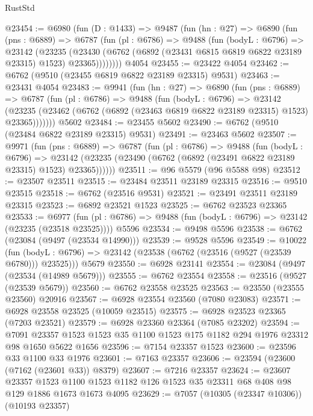 \begin{lexlean}{RustStd}
\begin{coremodule}
@23454 := @6980
    (fun (D : @1433) =>
    @9487
      (fun (hn : @27) =>
      @6890
        (fun (pns : @6889) =>
        @6787
          (fun (pl : @6786) =>
          @9488
            (fun (bodyL : @6796) =>
            @23142
              (@23235
                (@23430 (@6762 (@6892 (@23431 @6815 @6819 @6822 @23189 @23315) @1523) @23365))))))))
    @4054
@23455 := @23422 @4054
@23462 := @6762 (@9510 (@23455 @6819 @6822 @23189 @23315) @9531)
@23463 := @23431 @4054
@23483 := @9941
    (fun (hn : @27) =>
    @6890
      (fun (pns : @6889) =>
      @6787
        (fun (pl : @6786) =>
        @9488
          (fun (bodyL : @6796) =>
          @23142
            (@23235 (@23462 (@6762 (@6892 (@23463 @6819 @6822 @23189 @23315) @1523) @23365)))))))
    @5602
@23484 := @23455 @5602
@23490 := @6762 (@9510 (@23484 @6822 @23189 @23315) @9531)
@23491 := @23463 @5602
@23507 := @9971
    (fun (pns : @6889) =>
    @6787
      (fun (pl : @6786) =>
      @9488
        (fun (bodyL : @6796) =>
        @23142 (@23235 (@23490 (@6762 (@6892 (@23491 @6822 @23189 @23315) @1523) @23365))))))
@23511 := @96 @5579 (@96 @5588 @98)
@23512 := @23507 @23511
@23515 := @23484 @23511 @23189 @23315
@23516 := @9510 @23515
@23518 := @6762 (@23516 @9531)
@23521 := @23491 @23511 @23189 @23315
@23523 := @6892 @23521 @1523
@23525 := @6762 @23523 @23365
@23533 := @6977
    (fun (pl : @6786) => @9488 (fun (bodyL : @6796) => @23142 (@23235 (@23518 @23525))))
    @5596
@23534 := @9498 @5596
@23538 := @6762 (@23084 (@9497 (@23534 @14990)))
@23539 := @9528 @5596
@23549 := @10022
    (fun (bodyL : @6796) => @23142 (@23538 (@6762 (@23516 (@9527 (@23539 @6780))) @23525)))
    @5679
@23550 := @6928 @23141
@23554 := @23084 (@9497 (@23534 (@14989 @5679)))
@23555 := @6762 @23554
@23558 := @23516 (@9527 (@23539 @5679))
@23560 := @6762 @23558 @23525
@23563 := @23550 (@23555 @23560) @20916
@23567 := @6928 @23554 @23560 (@7080 @23083)
@23571 := @6928 @23558 @23525 (@10059 @23515)
@23575 := @6928 @23523 @23365 (@7203 @23521)
@23579 := @6928 @23360 @23364 (@7085 @23202)
@23594 := @7091
    @23357
    @1523
    @1523
    @35
    @1100
    @1523
    @175
    @1182
    @294
    @1976
    @23312
    @98
    @1650
    @5622
    @1656
@23596 := @7154 @23357 @1523
@23600 := @23596 @33 @1100 @33 @1976
@23601 := @7163 @23357
@23606 := @23594 (@23600 (@7162 (@23601 @33)) @8379)
@23607 := @7216 @23357
@23624 := @23607
    @23357
    @1523
    @1100
    @1523
    @1182
    @126
    @1523
    @35
    @23311
    @68
    @408
    @98
    @129
    @1886
    @1673
    @1673
    @4095
@23629 := @7057 (@10305 (@23347 @10306)) (@10193 @23357)

\end{coremodule}
\end{lexlean}
